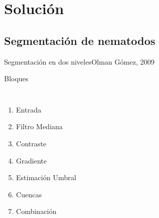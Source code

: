 \documentclass[15pt]{beamer} %
\begin{document}
\section{Solución}

\subsection{Segmentación de nematodos}


\begin{frame}{Segmentación en dos niveles}{{\tiny{Olman Gómez, 2009}}}
\end{frame}

\begin{frame}{Bloques}
  \begin{columns}
    \begin{enumerate}
    \item <1-| alert@1> Entrada
    \item <2-| alert@2> Filtro Mediana
    \item <3-| alert@3> Contraste
    \item <4-| alert@4> Gradiente
    \item <5-| alert@5> Estimación Umbral
    \item <6-| alert@6> Cuencas
    \item <7-| alert@6> Combinación
    \end{enumerate}

\end{columns}
\end{frame}
\end{document}
